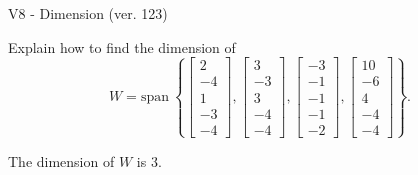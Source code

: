 \begin{exercise}
  \begin{exerciseTitle}V8 - Dimension (ver. 123)\end{exerciseTitle}
  \begin{exerciseStatement}
    Explain how to find the dimension of 
\[W=\mathrm{span}\ \left\{\left[\begin{array}{r}
2 \\
-4 \\
1 \\
-3 \\
-4
\end{array}\right] , \left[\begin{array}{r}
3 \\
-3 \\
3 \\
-4 \\
-4
\end{array}\right] , \left[\begin{array}{r}
-3 \\
-1 \\
-1 \\
-1 \\
-2
\end{array}\right] , \left[\begin{array}{r}
10 \\
-6 \\
4 \\
-4 \\
-4
\end{array}\right]\right\}.\]



  \end{exerciseStatement}
  \begin{exerciseAnswer}
   The dimension of \(W\) is  \(3\).
  


  \end{exerciseAnswer}
\end{exercise}